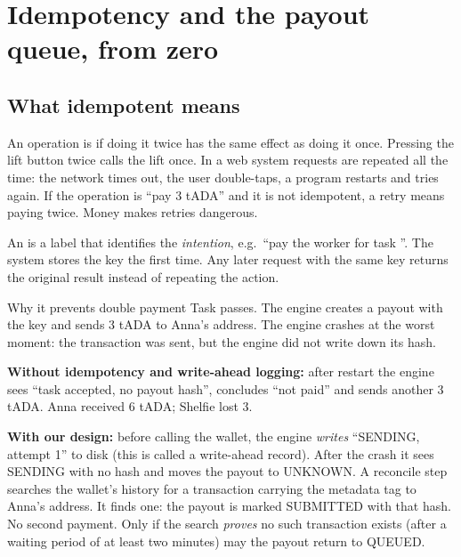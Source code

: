 \section{Idempotency and the payout queue, from zero}
\subsection{What idempotent means}
An operation is  if doing it twice has the same effect as doing it once. Pressing the lift button twice calls the lift once. In a web system requests are repeated all the time: the network times out, the user double-taps, a program restarts and tries again. If the operation is ``pay 3 tADA'' and it is not idempotent, a retry means paying twice. Money makes retries dangerous.

An  is a label that identifies the \emph{intention}, e.g.\ ``pay the worker for task ''. The system stores the key the first time. Any later request with the same key returns the original result instead of repeating the action.

\begin{examplebox}{Why it prevents double payment}
Task  passes. The engine creates a payout with the key  and sends 3 tADA to Anna's address. The engine crashes at the worst moment: the transaction was sent, but the engine did not write down its hash.

\textbf{Without idempotency and write-ahead logging:} after restart the engine sees ``task accepted, no payout hash'', concludes ``not paid'' and sends another 3 tADA. Anna received 6 tADA; Shelfie lost 3.

\textbf{With our design:} before calling the wallet, the engine \emph{writes} ``SENDING, attempt 1'' to disk (this is called a write-ahead record). After the crash it sees SENDING with no hash and moves the payout to UNKNOWN. A reconcile step searches the wallet's history for a transaction carrying the metadata tag  to Anna's address. It finds one: the payout is marked SUBMITTED with that hash. No second payment. Only if the search \emph{proves} no such transaction exists (after a waiting period of at least two minutes) may the payout return to QUEUED.
\end{examplebox}

